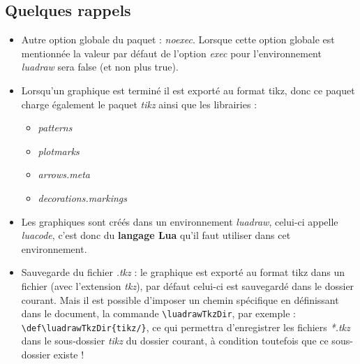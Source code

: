 \subsection{Quelques rappels}

\begin{itemize}
    \item Autre option globale du paquet : \emph{noexec}. Lorsque cette option globale est mentionnée la valeur par défaut de l'option \emph{exec} pour l'environnement \emph{luadraw} sera false (et non plus true).

    \item Lorsqu'un graphique est terminé il est exporté au format tikz, donc ce paquet charge également le paquet \emph{tikz} ainsi que les librairies :
    \begin{itemize}
        \item\emph{patterns}
        \item\emph{plotmarks}
        \item\emph{arrows.meta}
        \item\emph{decorations.markings}
        \end{itemize}
    \item Les graphiques sont créés dans un environnement \emph{luadraw}, celui-ci appelle \emph{luacode}, c'est donc du \textbf{langage Lua} qu'il faut utiliser dans cet environnement.

    \item Sauvegarde du fichier \emph{.tkz} : le graphique est exporté au format tikz dans un fichier (avec l'extension \emph{tkz}), par défaut celui-ci est sauvegardé dans le dossier courant. Mais il est possible d'imposer un chemin spécifique en définissant dans le document, la commande \verb|\luadrawTkzDir|, par exemple : \verb|\def\luadrawTkzDir{tikz/}|, ce qui permettra d'enregistrer les fichiers \emph{*.tkz} dans le sous-dossier \emph{tikz} du dossier courant, à condition toutefois que ce sous-dossier existe !


\end{itemize}
